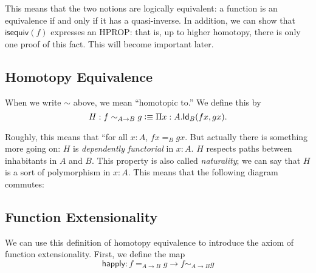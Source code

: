 \documentclass[12pt]{article}
\newcommand{\ap}{\mathsf{ap}}
\newcommand{\iseq}{\mathsf{isequiv}}
\newcommand{\happ}{\mathsf{happly}}
\begin{document}
This means that the two notions are logically equivalent: a function is an equivalence
if and only if it has a quasi-inverse. In addition, we can show that $\iseq(f)$ 
expresses an HPROP: that is, up to higher homotopy, there is only one proof of this fact.
This will become important later.


\subsection{Homotopy Equivalence}

When we write $\sim$ above, we mean ``homotopic to.'' We define this by
$$ H: f\sim_{A\to B} g \vcentcolon\equiv \Pi x:A.\mathsf{Id}_{B} (f x, g x).$$

Roughly, this means that ``for all $x:A$, $f x =_B g x$. But actually there is something more
going on: $H$ is \emph{dependently functorial} in $x:A$. $H$ respects paths between inhabitants
in $A$ and $B$. This property is also called \emph{naturality}; we can say that $H$ is
a sort of polymorphism in $x:A$. This means that the following diagram commutes:

\begin{center}
\end{center}


\subsection{Function Extensionality}

We can use this definition of homotopy equivalence to introduce the axiom of function
extensionality. First, we define the map
$$ \happ: f =_{A\to B} g \to f\sim_{A\to B} g$$
\end{document}
